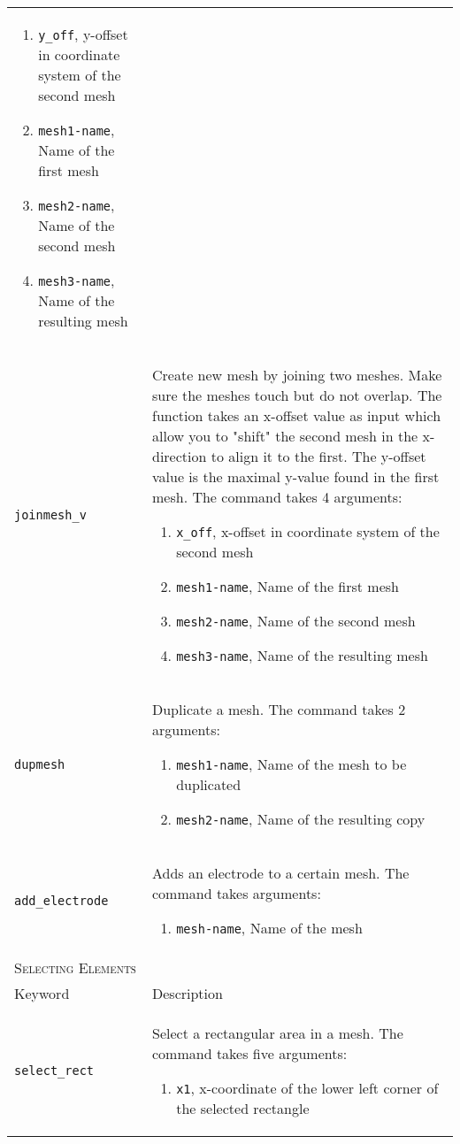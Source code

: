 \documentclass[noshowpacs,preprintnumbers,amsmath,amssymb, letter]{revtex4}
\begin{document}
\begin{longtable}{p{}p{}}
\begin{enumerate}
\item \texttt{y\_off}, y-offset in coordinate system of the second mesh 
\item \texttt{mesh1-name}, Name of the first mesh
\item \texttt{mesh2-name}, Name of the second mesh
\item \texttt{mesh3-name}, Name of the resulting mesh
\end{enumerate}\\
\texttt{joinmesh\_v}	& Create new mesh by joining two meshes. Make sure the meshes touch but do not overlap. The function takes an x-offset value as input which allow you to "shift" the second mesh in the x-direction to align it to the first. The y-offset value is the maximal y-value found in the first mesh. The command takes 4 arguments:
\begin{enumerate}
\item \texttt{x\_off}, x-offset in coordinate system of the second mesh 
\item \texttt{mesh1-name}, Name of the first mesh
\item \texttt{mesh2-name}, Name of the second mesh
\item \texttt{mesh3-name}, Name of the resulting mesh
\end{enumerate}\\
\texttt{dupmesh}	& Duplicate a mesh. The command takes 2 arguments:
\begin{enumerate}
\item \texttt{mesh1-name}, Name of the mesh to be duplicated
\item \texttt{mesh2-name}, Name of the resulting copy
\end{enumerate}\\
\texttt{add\_electrode}	& Adds an electrode to a certain mesh. The command takes arguments:
\begin{enumerate}
\item \texttt{mesh-name}, Name of the mesh
\end{enumerate}\\
\multicolumn{2}{l}{\textsc{Selecting Elements}} \\*
\hline
Keyword & Description \\
\texttt{select\_rect}	& Select a rectangular area in a mesh. The command takes five arguments:
\begin{enumerate}
\item \texttt{x1}, x-coordinate of the lower left corner of the selected rectangle

\end{enumerate}
\end{longtable}
\end{document}
